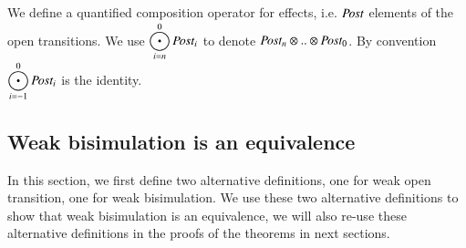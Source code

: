 \documentclass{elsarticle}
\begin{document}
We  define a quantified composition operator for effects, i.e. $\Post$ elements of the open transitions.
We use ${\displaystyle \bigodot_{i=n}^{0} \Post_i}$ to denote  $\Post_n\otimes .. \otimes \Post_0$. By convention ${\displaystyle \bigodot_{i=-1}^{0} \Post_i}$ is the identity. 



\subsection{Weak bisimulation is an equivalence}\label{app-WFH-equiv}

In this section, we first define two alternative definitions, one for weak open transition, one for  weak bisimulation. We use these two alternative definitions to show that weak bisimulation is an equivalence, we will also re-use these alternative definitions in the  proofs of the theorems in next sections.
\end{document}
